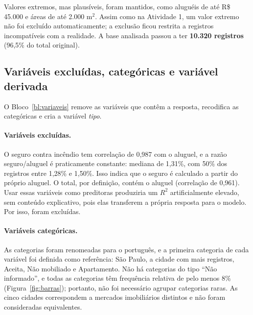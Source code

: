 \documentclass[12pt,a4paper]{article}
\newcommand{\Rtwo}{\ensuremath{R^2}}
\begin{document}
\begin{table}[H]
\centering
\caption{Registros excluídos por valores implausíveis (valores em R\$ por mês).}
\label{tab:excluidos}
\footnotesize

\end{table}

Valores extremos, mas plausíveis, foram mantidos, como aluguéis de até R\$ 45.000 e áreas de até 2.000 m$^2$. Assim como na Atividade 1, um valor extremo não foi excluído automaticamente; a exclusão ficou restrita a registros incompatíveis com a realidade. A base analisada passou a ter \textbf{10.320 registros} (96,5\% do total original).

\subsection{Variáveis excluídas, categóricas e variável derivada}

O Bloco~\ref{bl:variaveis} remove as variáveis que contêm a resposta, recodifica as categóricas e cria a variável \textit{tipo}.



\paragraph{Variáveis excluídas.} O seguro contra incêndio tem correlação de 0,987 com o aluguel, e a razão seguro/aluguel é praticamente constante: mediana de 1,31\%, com 50\% dos registros entre 1,28\% e 1,50\%. Isso indica que o seguro é calculado a partir do próprio aluguel. O total, por definição, contém o aluguel (correlação de 0,961). Usar essas variáveis como preditoras produziria um \Rtwo{} artificialmente elevado, sem conteúdo explicativo, pois elas transferem a própria resposta para o modelo. Por isso, foram excluídas.

\paragraph{Variáveis categóricas.} As categorias foram renomeadas para o português, e a primeira categoria de cada variável foi definida como referência: São Paulo, a cidade com mais registros, Aceita, Não mobiliado e Apartamento. Não há categorias do tipo ``Não informado'', e todas as categorias têm frequência relativa de pelo menos 8\% (Figura~\ref{fig:barras}); portanto, não foi necessário agrupar categorias raras. As cinco cidades correspondem a mercados imobiliários distintos e não foram consideradas equivalentes.
\end{document}
